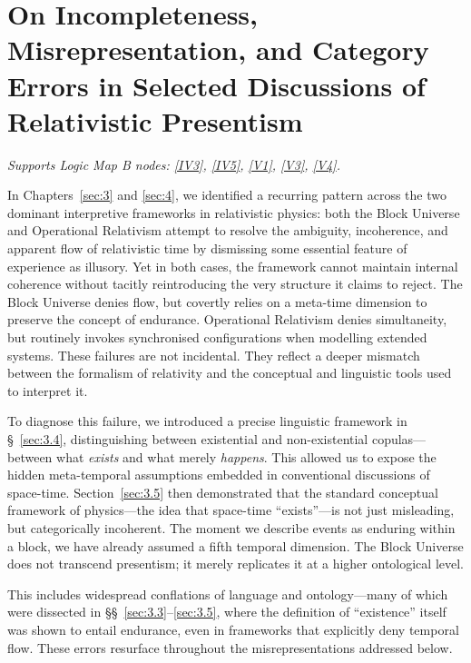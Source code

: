 \documentclass[12pt]{book}
\begin{document}
\section[On Selected Discussions of Relativistic Presentism]{On Incompleteness, Misrepresentation, and Category Errors in Selected Discussions of Relativistic Presentism}\label{sec:5.3}
\noindent\textit{Supports Logic Map B nodes: \hyperref[appendix:IV3]{[IV3]}, \hyperref[appendix:IV5]{[IV5]}, \hyperref[appendix:V1]{[V1]}, \hyperref[appendix:V3]{[V3]}, \hyperref[appendix:V4]{[V4]}.}

\vspace{4pt}

In Chapters~\ref{sec:3} and \ref{sec:4}, we identified a recurring pattern across the two dominant interpretive frameworks in relativistic physics: both the Block Universe and Operational Relativism attempt to resolve the ambiguity, incoherence, and apparent flow of relativistic time by dismissing some essential feature of experience as illusory. Yet in both cases, the framework cannot maintain internal coherence without tacitly reintroducing the very structure it claims to reject. The Block Universe denies flow, but covertly relies on a meta-time dimension to preserve the concept of endurance. Operational Relativism denies simultaneity, but routinely invokes synchronised configurations when modelling extended systems. These failures are not incidental. They reflect a deeper mismatch between the formalism of relativity and the conceptual and linguistic tools used to interpret it.

To diagnose this failure, we introduced a precise linguistic framework in \S~\ref{sec:3.4}, distinguishing between existential and non-existential copulas---between what \textit{exists} and what merely \textit{happens}. This allowed us to expose the hidden meta-temporal assumptions embedded in conventional discussions of space-time. Section~\ref{sec:3.5} then demonstrated that the standard conceptual framework of physics---the idea that space-time ``exists''---is not just misleading, but categorically incoherent. The moment we describe events as enduring within a block, we have already assumed a fifth temporal dimension. The Block Universe does not transcend presentism; it merely replicates it at a higher ontological level.

This includes widespread conflations of language and ontology---many of which were dissected in \S\S~\ref{sec:3.3}--\ref{sec:3.5}, where the definition of ``existence'' itself was shown to entail endurance, even in frameworks that explicitly deny temporal flow. These errors resurface throughout the misrepresentations addressed below.
\end{document}
